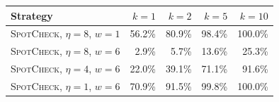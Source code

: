 \begin{tabular}{lrrrr}
\toprule
Strategy & $k{=}1$ & $k{=}2$ & $k{=}5$ & $k{=}10$ \\
\midrule
\textsc{SpotCheck}, $\eta{=}8$, $w{=}1$ & 56.2\% & 80.9\% & 98.4\% & 100.0\% \\
\textsc{SpotCheck}, $\eta{=}8$, $w{=}6$ & 2.9\% & 5.7\% & 13.6\% & 25.3\% \\
\textsc{SpotCheck}, $\eta{=}4$, $w{=}6$ & 22.0\% & 39.1\% & 71.1\% & 91.6\% \\
\textsc{SpotCheck}, $\eta{=}1$, $w{=}6$ & 70.9\% & 91.5\% & 99.8\% & 100.0\% \\
\bottomrule
\end{tabular}
